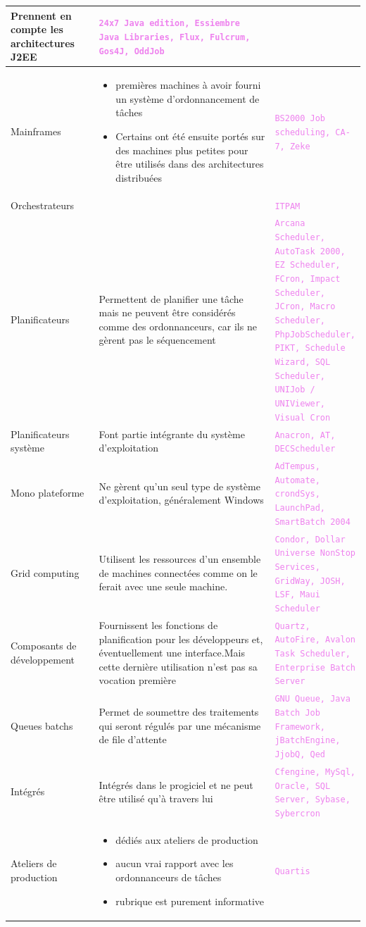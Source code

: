 \documentclass{bouygues-fr}
\begin{document}
\begin{longtable}{| p{0.25\linewidth} | p{0.5\linewidth} | p{0.25\linewidth} |}
    Prennent en compte les architectures J2EE &
    \textcolor{violet}{\texttt{24x7 Java edition, Essiembre Java Libraries, Flux, Fulcrum, Gos4J, OddJob}} \tabularnewline
    \hline
    Mainframes &
    \begin{itemize}
    \item premières machines à avoir fourni un système d’ordonnancement de tâches
    \item Certains ont été ensuite portés sur des machines plus petites pour être utilisés dans des architectures distribuées
    \end{itemize} &
    \textcolor{violet}{\texttt{BS2000 Job scheduling, CA-7, Zeke }} \tabularnewline
    \hline
    Orchestrateurs &
    &
    \textcolor{violet}{\texttt{ITPAM}} \tabularnewline
    \hline
    Planificateurs &
    Permettent de planifier une tâche mais ne peuvent être considérés comme des ordonnanceurs, car ils ne gèrent pas le séquencement &
    \textcolor{violet}{\texttt{Arcana Scheduler, AutoTask 2000, EZ Scheduler, FCron, Impact Scheduler, JCron, Macro Scheduler, PhpJobScheduler, PIKT, Schedule Wizard, SQL Scheduler, UNIJob / UNIViewer, Visual Cron}} \tabularnewline
    \hline
    Planificateurs système &
    Font partie intégrante du système d’exploitation &
    \textcolor{violet}{\texttt{Anacron, AT, DECScheduler}} \tabularnewline
    \hline
    Mono plateforme &
    Ne gèrent qu’un seul type de système d’exploitation, généralement Windows &
    \textcolor{violet}{\texttt{AdTempus, Automate, crondSys, LaunchPad, SmartBatch 2004}} \tabularnewline
    \hline
    Grid computing &
    Utilisent les ressources d’un ensemble de machines connectées comme on le ferait avec une seule machine. &
    \textcolor{violet}{\texttt{Condor, Dollar Universe NonStop Services, GridWay, JOSH, LSF, Maui Scheduler}} \tabularnewline
    \hline
    Composants de développement &
    Fournissent les fonctions de planification pour les développeurs et, éventuellement une interface.Mais cette dernière utilisation n’est pas sa vocation première &
    \textcolor{violet}{\texttt{Quartz, AutoFire, Avalon Task Scheduler, Enterprise Batch Server}} \tabularnewline
    \hline
    Queues batchs &
    Permet de soumettre des traitements qui seront régulés par une mécanisme de file d’attente &
    \textcolor{violet}{\texttt{GNU Queue, Java Batch Job Framework, jBatchEngine, JjobQ, Qed}} \tabularnewline
    \hline
    Intégrés &
    Intégrés dans le progiciel et ne peut être utilisé qu’à travers lui &
    \textcolor{violet}{\texttt{Cfengine, MySql, Oracle, SQL Server, Sybase, Sybercron}} \tabularnewline
    \hline
    Ateliers de production &
    \begin{itemize}
    \item dédiés aux ateliers de production 
    \item aucun vrai rapport avec les ordonnanceurs de tâches
    \item rubrique est purement informative
    \end{itemize}&
    \textcolor{violet}{\texttt{Quartis}} \tabularnewline
    \hline
  \end{longtable}
\end{document}
